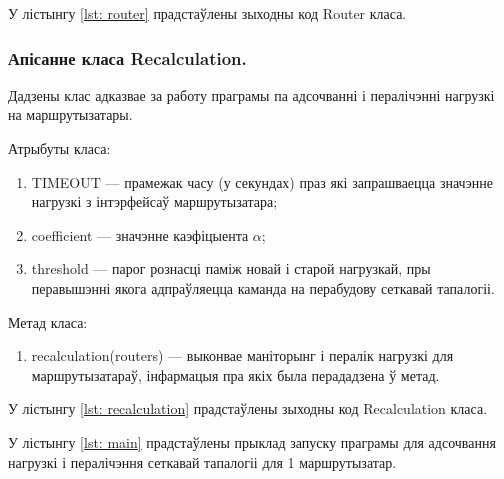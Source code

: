 У лістынгу \ref{lst: router} прадстаўлены зыходны код Router класа.



\subsubsection{Апісанне класа Recalculation.}

Дадзены клас адказвае за работу праграмы па адсочванні і пералічэнні нагрузкі на
маршрутызатары.

Атрыбуты класа:
\begin{enumerate}
    \item TIMEOUT --- прамежак часу (у секундах) праз які запрашваецца значэнне нагрузкі з інтэрфейсаў маршрутызатара;
    \item coefficient --- значэнне каэфіцыента $\alpha$;
    \item threshold --- парог рознасці паміж новай і старой нагрузкай, пры
    перавышэнні якога адпраўляецца каманда на перабудову сеткавай тапалогіі.
\end{enumerate}

Метад класа:
\begin{enumerate}
    \item recalculation(routers) --- выконвае маніторынг і пералік нагрузкі для маршрутызатараў, інфармацыя пра якіх была перададзена ў метад.
\end{enumerate}

У лістынгу \ref{lst: recalculation} прадстаўлены зыходны код Recalculation класа.



У лістынгу  \ref{lst: main} прадстаўлены прыклад запуску праграмы для адсочвання
нагрузкі і пералічэння сеткавай тапалогіі для 1 маршрутызатар.



